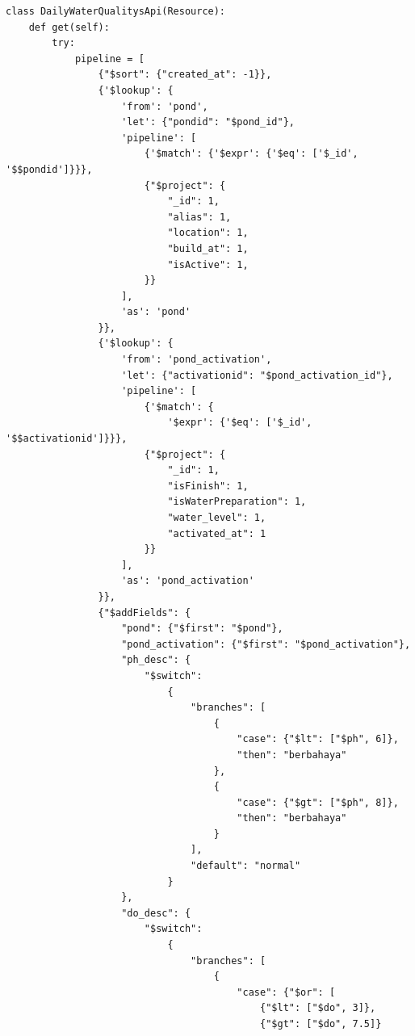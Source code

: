 \begin{enumerate}[1.]
\begin{lstlisting}
class DailyWaterQualitysApi(Resource):
    def get(self):
        try:
            pipeline = [
                {"$sort": {"created_at": -1}},
                {'$lookup': {
                    'from': 'pond',
                    'let': {"pondid": "$pond_id"},
                    'pipeline': [
                        {'$match': {'$expr': {'$eq': ['$_id', '$$pondid']}}},
                        {"$project": {
                            "_id": 1,
                            "alias": 1,
                            "location": 1,
                            "build_at": 1,
                            "isActive": 1,
                        }}
                    ],
                    'as': 'pond'
                }},
                {'$lookup': {
                    'from': 'pond_activation',
                    'let': {"activationid": "$pond_activation_id"},
                    'pipeline': [
                        {'$match': {
                            '$expr': {'$eq': ['$_id', '$$activationid']}}},
                        {"$project": {
                            "_id": 1,
                            "isFinish": 1,
                            "isWaterPreparation": 1,
                            "water_level": 1,
                            "activated_at": 1
                        }}
                    ],
                    'as': 'pond_activation'
                }},
                {"$addFields": {
                    "pond": {"$first": "$pond"},
                    "pond_activation": {"$first": "$pond_activation"},
                    "ph_desc": {
                        "$switch":
                            {
                                "branches": [
                                    {
                                        "case": {"$lt": ["$ph", 6]},
                                        "then": "berbahaya"
                                    },
                                    {
                                        "case": {"$gt": ["$ph", 8]},
                                        "then": "berbahaya"
                                    }
                                ],
                                "default": "normal"
                            }
                    },
                    "do_desc": {
                        "$switch":
                            {
                                "branches": [
                                    {
                                        "case": {"$or": [
                                            {"$lt": ["$do", 3]},
                                            {"$gt": ["$do", 7.5]}

\end{lstlisting}
\end{enumerate}
